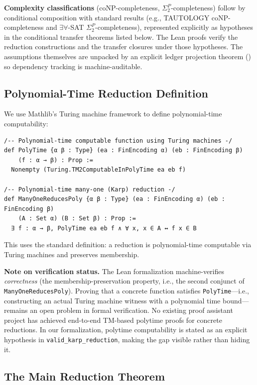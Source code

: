 \textbf{Complexity classifications} (coNP-completeness, $\Sigma_2^P$-completeness) follow by conditional composition with standard results (e.g., TAUTOLOGY coNP-completeness and $\exists\forall$-SAT $\Sigma_2^P$-completeness), represented explicitly as hypotheses in the conditional transfer theorems listed below. The Lean proofs verify the reduction constructions and the transfer closures under those hypotheses.
The assumptions themselves are unpacked by an explicit ledger projection theorem () so dependency tracking is machine-auditable.

\subsection{Polynomial-Time Reduction Definition}

We use Mathlib's Turing machine framework to define polynomial-time computability:

\begin{verbatim}
/-- Polynomial-time computable function using Turing machines -/
def PolyTime {α β : Type} (ea : FinEncoding α) (eb : FinEncoding β) 
    (f : α → β) : Prop :=
  Nonempty (Turing.TM2ComputableInPolyTime ea eb f)

/-- Polynomial-time many-one (Karp) reduction -/
def ManyOneReducesPoly {α β : Type} (ea : FinEncoding α) (eb : FinEncoding β)
    (A : Set α) (B : Set β) : Prop :=
  ∃ f : α → β, PolyTime ea eb f ∧ ∀ x, x ∈ A ↔ f x ∈ B
\end{verbatim}

This uses the standard definition: a reduction is polynomial-time computable via Turing machines and preserves membership.

\textbf{Note on verification status.} The Lean formalization machine-verifies \emph{correctness} (the membership-preservation property, i.e., the second conjunct of \texttt{ManyOneReducesPoly}). Proving that a concrete function satisfies \texttt{PolyTime}---i.e., constructing an actual Turing machine witness with a polynomial time bound---remains an open problem in formal verification. No existing proof assistant project has achieved end-to-end TM-based polytime proofs for concrete reductions. In our formalization, polytime computability is stated as an explicit hypothesis in \texttt{valid\_karp\_reduction}, making the gap visible rather than hiding it.

\subsection{The Main Reduction Theorem}

